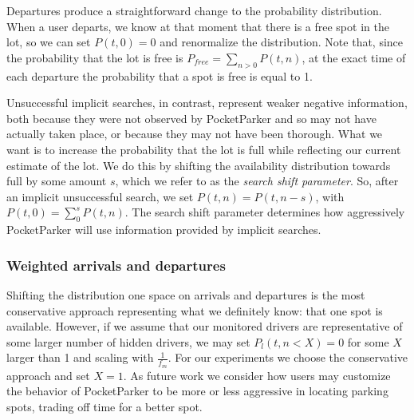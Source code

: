 Departures produce a straightforward change to the probability distribution.
When a user departs, we know at that moment that there is a free spot in the
lot, so we can set $P(t, 0) = 0$ and renormalize the distribution. Note that,
since the probability that the lot is free is $P_{free} = \sum_{n > 0} P(t,
n)$, at the exact time of each departure the probability that a spot is free
is equal to 1. 

Unsuccessful implicit searches, in contrast, represent weaker negative
information, both because they were not observed by PocketParker and so may
not have actually taken place, or because they may not have been thorough.
What we want is to increase the probability that the lot is full while
reflecting our current estimate of the lot. We do this by shifting the
availability distribution towards full by some amount $s$, which we refer to
as the \textit{search shift parameter}. So, after an implicit unsuccessful
search, we set $P(t, n) = P(t, n - s)$, with $P(t, 0) = \sum_0^s P(t, n)$.
The search shift parameter determines how aggressively PocketParker will use
information provided by implicit searches.

\subsubsection{Weighted arrivals and departures}

Shifting the distribution one space on arrivals and departures is the most
conservative approach representing what we definitely know: that one spot is
available. However, if we assume that our monitored drivers are
representative of some larger number of hidden drivers, we may set $P_l(t, n
< X) = 0$ for some $X$ larger than 1 and scaling with $\frac{1}{f_m}$. For
our experiments we choose the conservative approach and set $X = 1$. As
future work we consider how users may customize the behavior of PocketParker
to be more or less aggressive in locating parking spots, trading off time for
a better spot.
